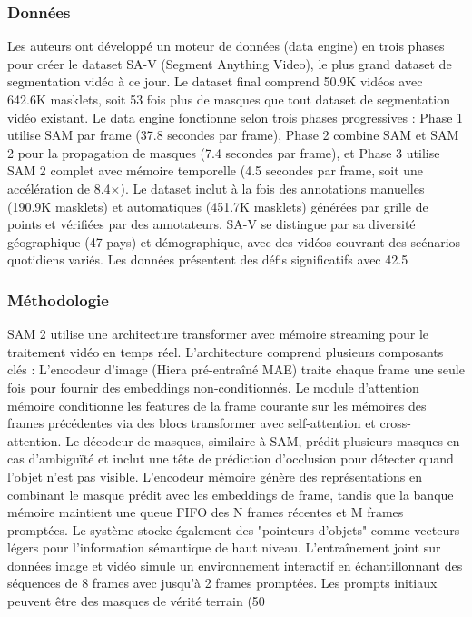 \subsubsection{Données}
Les auteurs ont développé un moteur de données (data engine) en trois phases pour créer le dataset SA-V (Segment Anything Video), le plus grand dataset de segmentation vidéo à ce jour. Le dataset final comprend 50.9K vidéos avec 642.6K masklets, soit 53 fois plus de masques que tout dataset de segmentation vidéo existant.
Le data engine fonctionne selon trois phases progressives : Phase 1 utilise SAM par frame (37.8 secondes par frame), Phase 2 combine SAM et SAM 2 pour la propagation de masques (7.4 secondes par frame), et Phase 3 utilise SAM 2 complet avec mémoire temporelle (4.5 secondes par frame, soit une accélération de 8.4×). Le dataset inclut à la fois des annotations manuelles (190.9K masklets) et automatiques (451.7K masklets) générées par grille de points et vérifiées par des annotateurs.
SA-V se distingue par sa diversité géographique (47 pays) et démographique, avec des vidéos couvrant des scénarios quotidiens variés. Les données présentent des défis significatifs avec 42.5%
\subsubsection{Méthodologie}
SAM 2 utilise une architecture transformer avec mémoire streaming pour le traitement vidéo en temps réel. L'architecture comprend plusieurs composants clés :
L'encodeur d'image (Hiera pré-entraîné MAE) traite chaque frame une seule fois pour fournir des embeddings non-conditionnés. Le module d'attention mémoire conditionne les features de la frame courante sur les mémoires des frames précédentes via des blocs transformer avec self-attention et cross-attention. Le décodeur de masques, similaire à SAM, prédit plusieurs masques en cas d'ambiguïté et inclut une tête de prédiction d'occlusion pour détecter quand l'objet n'est pas visible.
L'encodeur mémoire génère des représentations en combinant le masque prédit avec les embeddings de frame, tandis que la banque mémoire maintient une queue FIFO des N frames récentes et M frames promptées. Le système stocke également des "pointeurs d'objets" comme vecteurs légers pour l'information sémantique de haut niveau.
L'entraînement joint sur données image et vidéo simule un environnement interactif en échantillonnant des séquences de 8 frames avec jusqu'à 2 frames promptées. Les prompts initiaux peuvent être des masques de vérité terrain (50%
